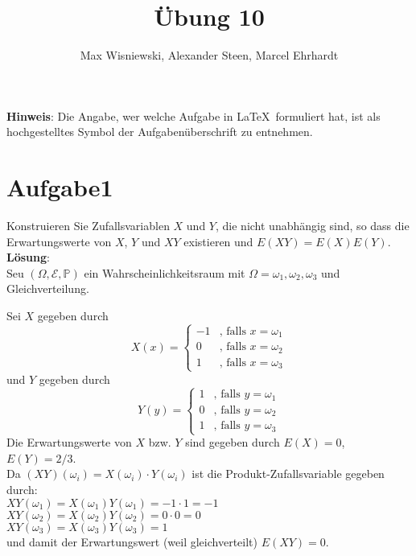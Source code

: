 \documentclass[11pt,a4paper,ngerman]{article}
\date{}
\title{Übung 10}
\author{Max Wisniewski\maxw, Alexander Steen\alex, Marcel Ehrhardt\marcel}
\newcommand{\Prob}{\mathbb{P}}
\newcommand{\Epsilon}{\mathcal{E}}
\begin{document}

\renewcommand{\figurename}{Figure}

\maketitle
\thispagestyle{fancy}

\begin{center}
\textbf{Hinweis}: Die Angabe, wer welche Aufgabe in \LaTeX\ formuliert hat, ist als hochgestelltes Symbol der Aufgabenüberschrift zu entnehmen.
\end{center}


\section*{Aufgabe1}
Konstruieren Sie Zufallsvariablen $X$ und $Y$, die nicht unabhängig sind, so dass die
Erwartungswerte von $X$, $Y$ und $XY$ existieren und $E(XY) = E(X)E(Y)$. \\

\textbf{Lösung}: \\
Seu $(\Omega, \Epsilon, \Prob)$ ein Wahrscheinlichkeitsraum mit $\Omega = {\omega_1, \omega_2, \omega_3}$ und Gleichverteilung.

Sei $X$ gegeben durch
\begin{equation}
X(x) = \begin{cases}
         -1 & \text{, falls $x = \omega_1$}\\
         0 & \text{, falls $x = \omega_2$}\\
         1 & \text{, falls $x = \omega_3$}
       \end{cases}
\end{equation}
und $Y$ gegeben durch
\begin{equation}
Y(y) = \begin{cases}
         1 & \text{, falls $y = \omega_1$}\\
         0 & \text{, falls $y = \omega_2$}\\
         1 & \text{, falls $y = \omega_3$}
       \end{cases}
\end{equation}
Die Erwartungswerte von $X$ bzw. $Y$ sind gegeben durch $E(X) = 0$, $E(Y) = 2/3$. \\
Da $(XY)(\omega_i) = X(\omega_i) \cdot Y(\omega_i)$ ist die Produkt-Zufallsvariable gegeben durch: \\
$XY(\omega_1) = X(\omega_1)Y(\omega_1) = -1  \cdot 1 = -1$ \\
$XY(\omega_2) = X(\omega_2)Y(\omega_2) = 0 \cdot 0 = 0$ \\
$XY(\omega_3) =X(\omega_3)Y(\omega_3)  = 1$ \\
und damit der Erwartungswert (weil gleichverteilt) $E(XY) = 0$. \\
\end{document}
